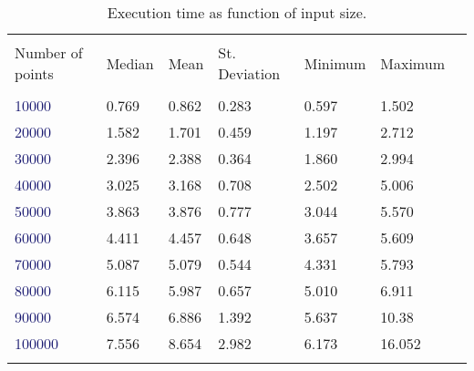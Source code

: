 \documentclass[
12pt,
a4paper,
oneside,
headinclude,
footinclude]{report}
\theoremstyle{definition} %
\begin{document}
\begin{table}[h]
	\centering %
	
	\begin{tabular}{l l l l l l l} %
		\hline
		\hline 
		\\[-1.5ex]
		\textcolor{BrickRed}{Number of points} & \textcolor{BrickRed}{Median} & \textcolor{BrickRed}{Mean} & \textcolor{BrickRed}{St. Deviation} & \textcolor{BrickRed}{Minimum} & \textcolor{BrickRed}{Maximum}\\ [0.5ex]
		\hline %
		\\[-1.5ex]		
			\textcolor{MidnightBlue}{10000} & 0.769  & 0.862 & 0.283 & 0.597 & 1.502\\
			\textcolor{MidnightBlue}{20000} & 1.582  & 1.701 & 0.459 & 1.197 & 2.712\\
			\textcolor{MidnightBlue}{30000} & 2.396  & 2.388 & 0.364 & 1.860 & 2.994\\
			\textcolor{MidnightBlue}{40000} & 3.025  & 3.168 & 0.708 & 2.502 & 5.006\\
			\textcolor{MidnightBlue}{50000} & 3.863  & 3.876 & 0.777 & 3.044 & 5.570\\
			\textcolor{MidnightBlue}{60000} & 4.411  & 4.457 & 0.648 & 3.657 & 5.609\\
			\textcolor{MidnightBlue}{70000} & 5.087  & 5.079 & 0.544 & 4.331 & 5.793\\
			\textcolor{MidnightBlue}{80000} & 6.115  & 5.987 & 0.657 & 5.010 & 6.911\\
			\textcolor{MidnightBlue}{90000} & 6.574  & 6.886 & 1.392 & 5.637 & 10.38\\
			\textcolor{MidnightBlue}{100000} & 7.556 & 8.654 & 2.982 & 6.173 & 16.052\\[1ex]
		
		\hline %
		\caption{Execution time as function of input size.}
	\end{tabular}
\end{table}



%
%
\end{document}
